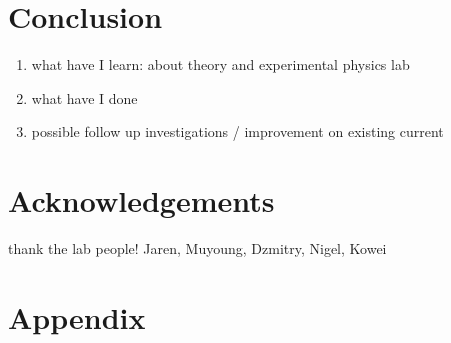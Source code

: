 \documentclass[11pt,A4Paper]{article}
\begin{document}
\section{Conclusion}
\begin{enumerate}
    \item what have I learn: about theory and experimental physics lab
    \item what have I done 
    \item possible follow up investigations / improvement on existing current
\end{enumerate}

\section{Acknowledgements}
thank the lab people! Jaren, Muyoung, Dzmitry, Nigel, Kowei

\section{Appendix}




\end{document}
